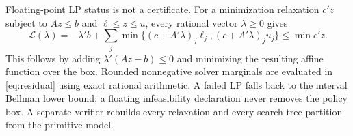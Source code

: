 Floating-point LP status is not a certificate. For a minimization relaxation $c'z$ subject to $Az\leq b$ and $\ell\leq z\leq u$, every rational vector $\lambda\geq0$ gives
\begin{equation}\label{eq:residual}
 \mathcal L(\lambda)=-\lambda'b+
 \sum_j\min\{(c+A'\lambda)_j\ell_j,(c+A'\lambda)_ju_j\}
 \leq\min c'z.
\end{equation}
This follows by adding $\lambda'(Az-b)\leq0$ and minimizing the resulting affine function over the box. Rounded nonnegative solver marginals are evaluated in \eqref{eq:residual} using exact rational arithmetic. A failed LP falls back to the interval Bellman lower bound; a floating infeasibility declaration never removes the policy box. A separate verifier rebuilds every relaxation and every search-tree partition from the primitive model.

